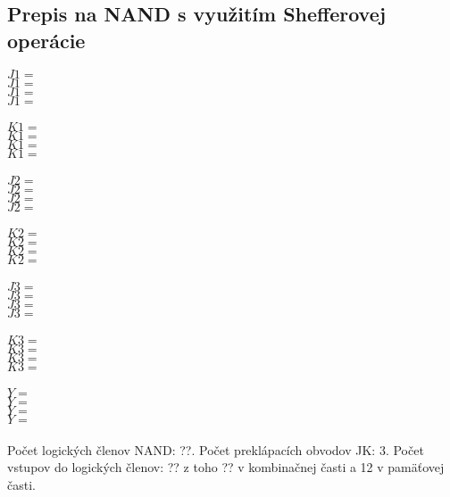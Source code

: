 \documentclass{article}
\begin{document}
\subsection{Prepis na NAND s využitím Shefferovej operácie}
$J1 = $\\
$J1 = $\\
$J1 = $\\
$J1 = $\\\\
$K1 = $\\
$K1 = $\\
$K1 = $\\
$K1 = $\\\\
$J2 = $\\
$J2 = $\\
$J2 = $\\
$J2 = $\\\\
$K2 = $\\
$K2 = $\\
$K2 = $\\
$K2 = $\\\\
$J3 = $\\
$J3 = $\\
$J3 = $\\
$J3 = $\\\\
$K3 = $\\
$K3 = $\\
$K3 = $\\
$K3 = $\\\\
$Y = $\\
$Y = $\\
$Y = $\\
$Y = $\\\\
Počet logických členov NAND: ??. 
Počet preklápacích obvodov JK: 3. 
Počet vstupov do logických členov: ?? z toho ?? v kombinačnej časti a 12 v pamäťovej časti.
\end{document}
